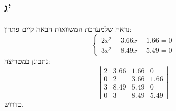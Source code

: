 \documentclass[]{article}
\newcommand\detms[1]    {\sof{\begin{matrix}
            #1
\end{matrix}}}
\newcommand\sof[1]    {\left | #1 \right |}
\theoremstyle{definition}
\begin{document}
    \subsection*{ג'}
    נראה שלמערכת המשוואות הבאה קיים פתרון: 
    \[ \begin{cases}
        2x^2 + 3.66x + 1.66 = 0\\
        3x^2 + 8.49x + 5.49 = 0
    \end{cases} \]
    נתבונן במטריצה: 
    \[ \detms{2 & 3.66 & 1.66 & 0 \\ 0 & 2 & 3.66 & 1.66 \\ 3 & 8.49 & 5.49 & 0 \\ 0 & 3 & 8.49 & 5.49} \]
    כדרוש. 
    
    \section{}
    
\end{document}
